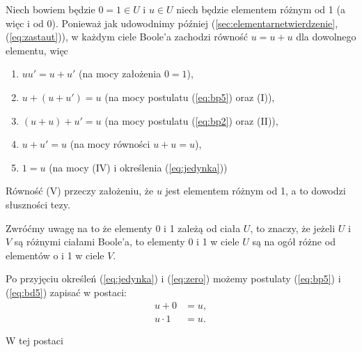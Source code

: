 \documentclass[12 pt, a4paper, leqno]{book}
\numberwithin{equation}{section}
\newcommand{\refb}[1]{(\ref{#1})}
\begin{document}
 Niech bowiem będzie $0 = 1 \in U$ i $u \in U$ niech będzie elementem różnym od 1 (a więc i od 0).
 Ponieważ jak udowodnimy później (\ref{sec:elementarnetwierdzenie}, \refb{eq:zastaut}), w każdym ciele 
 Boole'a zachodzi równość $u=u+u$ dla dowolnego elementu, więc
\begin{enumerate}[label=(\Roman*), labelsep=2em]
  \item $uu' = u + u'$ (na mocy założenia $0=1$), 
  \item $u+(u+u')=u$ (na mocy postulatu \refb{eq:bp5} oraz (\RN{1})),
  \item $(u+u)+u'=u$ (na mocy postulatu \refb{eq:bp2} oraz (\RN{2})),
  \item $u+u'=u$ (na mocy równości $u+u=u$),
  \item $1=u$ (na mocy (\RN{4}) i określenia \refb{eq:jedynka})
\end{enumerate}

Równość (\RN{5}) przeczy założeniu, że $u$ jest elementem różnym od 1, a to dowodzi słuszności tezy.

Zwróćmy uwagę na to że elementy 0 i 1 zależą od ciała $U$, to znaczy, że jeżeli $U$ i $V$ są różnymi ciałami
Boole'a, to elementy 0 i 1 w ciele $U$ są na ogół różne od elementów o i 1 w ciele $V$.

Po przyjęciu określeń \refb{eq:jedynka} i \refb{eq:zero} możemy postulaty \refb{eq:bp5} i
\refb{eq:bd5} zapisać w postaci:
\begin{align*}
u+0 &= u, \\
u \cdot 1 &= u. 
\end{align*}

W tej postaci
\end{document}
